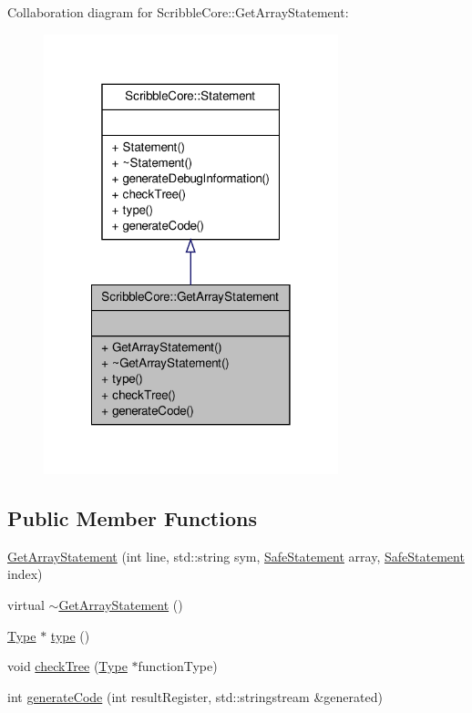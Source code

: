 Collaboration diagram for Scribble\-Core\-:\-:Get\-Array\-Statement\-:
\nopagebreak
\begin{figure}[H]
\begin{center}
\leavevmode
\includegraphics[width=242pt]{class_scribble_core_1_1_get_array_statement__coll__graph}
\end{center}
\end{figure}
\subsection*{Public Member Functions}
\begin{DoxyCompactItemize}
\item 
\hyperlink{class_scribble_core_1_1_get_array_statement_aab7ddecc527fa8a2f6bff2b0a6354459}{Get\-Array\-Statement} (int line, std\-::string sym, \hyperlink{namespace_scribble_core_a2ad5bf236bc9164cb56f564685f15a11}{Safe\-Statement} array, \hyperlink{namespace_scribble_core_a2ad5bf236bc9164cb56f564685f15a11}{Safe\-Statement} index)
\item 
virtual \hyperlink{class_scribble_core_1_1_get_array_statement_aabfbf97c517e312f4c7a3e3791e8e784}{$\sim$\-Get\-Array\-Statement} ()
\item 
\hyperlink{class_scribble_core_1_1_type}{Type} $\ast$ \hyperlink{class_scribble_core_1_1_get_array_statement_a3aeddab53d3243cd50d58f233f773578}{type} ()
\item 
void \hyperlink{class_scribble_core_1_1_get_array_statement_af43c3592ddafac3d5a73d7c0cd3684a2}{check\-Tree} (\hyperlink{class_scribble_core_1_1_type}{Type} $\ast$function\-Type)
\item 
int \hyperlink{class_scribble_core_1_1_get_array_statement_a7cc5ada009b6b5264e1809dece0fc315}{generate\-Code} (int result\-Register, std\-::stringstream \&generated)
\end{DoxyCompactItemize}


